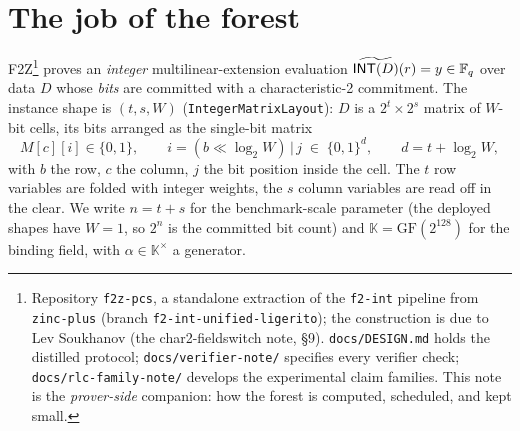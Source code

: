 \documentclass[11pt]{article}
\newcommand{\F}{\mathbb{F}}
\newcommand{\K}{\mathbb{K}}            %
\newcommand{\Kx}{\K^{\times}}
\newcommand{\Fq}{\F_q}                 %
\newcommand{\bits}{\{0,1\}}
\newcommand{\INT}{\mathsf{INT}}
\newcommand{\mle}[1]{\widetilde{#1}}
\newcommand{\code}[1]{{\def\_{\textunderscore\allowbreak}\texttt{#1}}}
\theoremstyle{definition}
\begin{document}
\section{The job of the forest}
\label{sec:job}

F2Z\footnote{Repository \code{f2z-pcs}, a standalone extraction of the
\code{f2-int} pipeline from \code{zinc-plus} (branch
\code{f2-int-unified-ligerito}); the construction is due to Lev Soukhanov
(the char2-fieldswitch note, \S9).  \code{docs/DESIGN.md} holds the
distilled protocol; \code{docs/verifier-note/} specifies every verifier
check; \code{docs/rlc-family-note/} develops the experimental claim
families.  This note is the \emph{prover-side} companion: how the forest
is computed, scheduled, and kept small.} proves an \emph{integer}
multilinear-extension evaluation
$\smash{\mle{\INT(D)}}(r) = y \in \Fq$ over data $D$ whose \emph{bits}
are committed with a characteristic-2 commitment.  The instance shape is
$(t, s, W)$ (\code{IntegerMatrixLayout}): $D$ is a $2^t \times 2^s$ matrix of
$W$-bit cells, its bits arranged as the single-bit matrix
\[
  M[c][i] \in \bits, \qquad
  i = (b \ll \log_2 W)\,|\,j \;\in\; \bits^{d}, \qquad
  d = t + \log_2 W ,
\]
with $b$ the row, $c$ the column, $j$ the bit position inside the cell.
The $t$ row variables are folded with integer weights, the $s$ column
variables are read off in the clear.  We write $n = t + s$ for the
benchmark-scale parameter (the deployed shapes have $W = 1$, so $2^n$ is
the committed bit count) and $\K = \mathrm{GF}(2^{128})$ for the binding
field, with $\alpha \in \Kx$ a generator.
\end{document}
